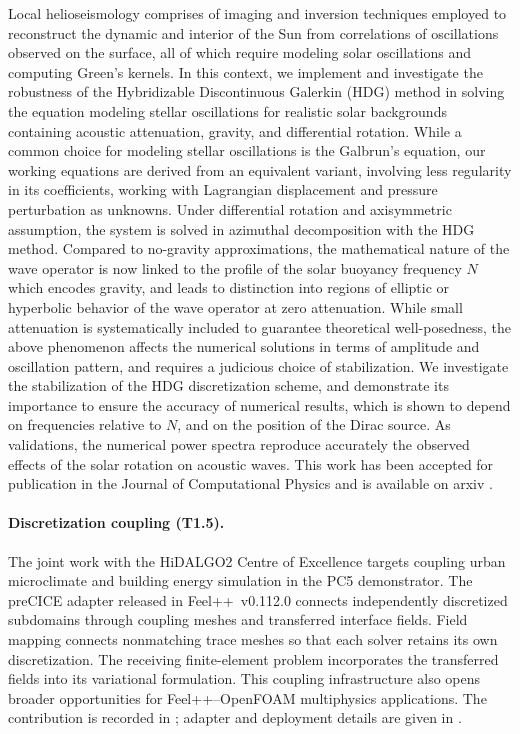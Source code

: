 Local helioseismology comprises of imaging and inversion techniques employed to reconstruct the dynamic and interior of the Sun from correlations of oscillations observed on the surface, all of which require modeling solar oscillations and computing Green’s kernels. In this context, we implement and investigate the robustness of the Hybridizable Discontinuous Galerkin (HDG) method in
solving the equation modeling stellar oscillations for realistic solar backgrounds containing acoustic attenuation, gravity, and differential rotation. While a common choice for modeling stellar oscillations is the Galbrun’s equation, our working equations are derived from an equivalent variant,
involving less regularity in its coefficients, working with Lagrangian displacement and pressure perturbation as unknowns. Under differential rotation and axisymmetric assumption, the system is solved in azimuthal decomposition with the HDG method. Compared to no-gravity approximations, the mathematical nature of the wave operator is now linked to the profile of the solar buoyancy
frequency $N$ which encodes gravity, and leads to distinction into regions of elliptic or hyperbolic behavior of the wave operator at zero attenuation. While small attenuation is systematically included to guarantee theoretical well-posedness, the above phenomenon affects the numerical solutions in
terms of amplitude and oscillation pattern, and requires a judicious choice of stabilization. We investigate the stabilization of the HDG discretization scheme, and demonstrate its importance to ensure the accuracy of numerical results, which is shown to depend on frequencies relative to $N$, and on the position of the Dirac source. As validations, the numerical power spectra reproduce accurately the observed effects of the solar rotation on acoustic waves. This work has been accepted for publication in the Journal of Computational Physics and is available on arxiv \cite{phamNumericalSimulationsOscillations2025}.

\paragraph{Discretization coupling (T1.5).}
The joint work with the HiDALGO2 Centre of Excellence targets coupling
urban microclimate and building energy simulation in the PC5
\KtirioUrbanBuildingContext{} demonstrator. The preCICE adapter released in
Feel++~v0.112.0 connects independently discretized subdomains through coupling
meshes and transferred interface fields. Field mapping connects nonmatching
trace meshes so that each solver retains its own discretization. The receiving
finite-element problem incorporates the transferred fields into its variational
formulation.
This coupling infrastructure also opens broader opportunities for
Feel++--OpenFOAM multiphysics applications.
The contribution is recorded in ; adapter
and deployment details are given in
.

